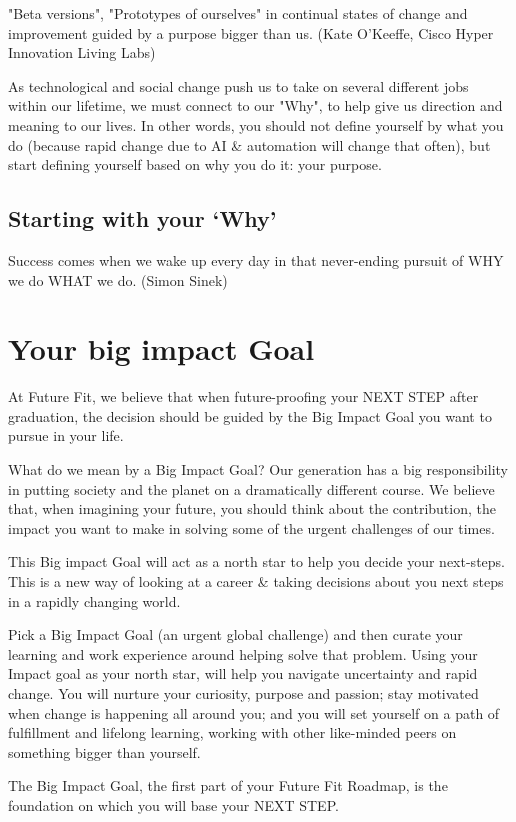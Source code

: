\documentclass[11pt]{book} %
\begin{document}
		"Beta versions", "Prototypes of ourselves" in continual states of change and improvement guided by a purpose bigger than us.
(Kate O'Keeffe, Cisco Hyper Innovation Living Labs) 
	
		As technological and social change push us to take on several different jobs within our lifetime, we must connect to our "Why", to help give us direction and meaning to our lives. In other words, you should not define yourself by what you do (because rapid change due to AI \& automation will change that often), but start defining yourself based on why you do it: your purpose. 
		\subsection{Starting with your \lq{}Why\rq{}}
			Success comes when we wake up every day in that never-ending pursuit of WHY we do WHAT we do. (Simon Sinek)
	\section{Your big impact Goal}
		At Future Fit, we believe that when future-proofing your NEXT STEP after graduation, the decision should be guided by the Big Impact Goal you want to pursue in your life. 

		What do we mean by a Big Impact Goal? 
		Our generation has a big responsibility in putting society and the planet on a dramatically different course. We believe that, when imagining your future, you should think about the contribution, the impact you want to make in solving some of the urgent challenges of our times. 

		This Big impact Goal will act as a north star to help you decide your next-steps. This is a new way of looking at a career \& taking decisions about you next steps in a rapidly changing world.

		Pick a Big Impact Goal (an urgent global challenge) and then curate your learning and work experience around helping solve that problem. Using your Impact goal as your north star,  will help you navigate uncertainty and rapid change. You will nurture your curiosity, purpose and passion; stay motivated when change is happening all around you; and you will set yourself on a path of fulfillment and lifelong learning, working with other like-minded peers on something bigger than yourself.
		
		The Big Impact Goal, the first part of your Future Fit Roadmap, is the foundation on which you will base your NEXT STEP. 
\end{document}
